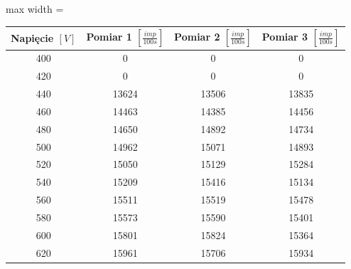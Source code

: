 \documentclass[a4paper,11pt]{extarticle}
\begin{document}
  \begin{table}[H]
    \centering
    \begin{adjustbox}{max width = \textwidth}
    \begin{tabular}{cccc}
      \toprule
      \textbf{Napięcie \( [V] \)} & \textbf{Pomiar 1 \( [\frac{imp}{100s}] \)} & \textbf{Pomiar 2 \( [\frac{imp}{100s}] \)} & \textbf{Pomiar 3 \( [\frac{imp}{100s}] \)} \\
      \midrule
      400                       & 0                 & 0                 & 0                 \\
      420                       & 0                 & 0                 & 0                 \\
      440                       & 13624             & 13506             & 13835             \\
      460                       & 14463             & 14385             & 14456             \\
      480                       & 14650             & 14892             & 14734             \\
      500                       & 14962             & 15071             & 14893             \\
      520                       & 15050             & 15129             & 15284             \\
      540                       & 15209             & 15416             & 15134             \\
      560                       & 15511             & 15519             & 15478             \\
      580                       & 15573             & 15590             & 15401             \\
      600                       & 15801             & 15824             & 15364             \\
      620                       & 15961             & 15706             & 15934             \\
      \bottomrule
    \end{tabular}
    \end{adjustbox}
  \end{table}
\end{document}
